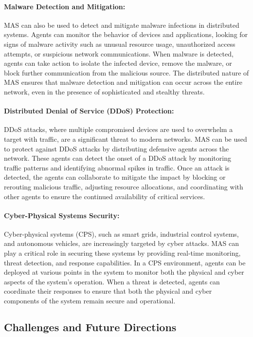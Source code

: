 \paragraph{Malware Detection and Mitigation:}
MAS can also be used to detect and mitigate malware infections in distributed systems. Agents can monitor the behavior of devices and applications, looking for signs of malware activity such as unusual resource usage, unauthorized access attempts, or suspicious network communications. When malware is detected, agents can take action to isolate the infected device, remove the malware, or block further communication from the malicious source. The distributed nature of MAS ensures that malware detection and mitigation can occur across the entire network, even in the presence of sophisticated and stealthy threats.

\paragraph{Distributed Denial of Service (DDoS) Protection:}
DDoS attacks, where multiple compromised devices are used to overwhelm a target with traffic, are a significant threat to modern networks. MAS can be used to protect against DDoS attacks by distributing defensive agents across the network. These agents can detect the onset of a DDoS attack by monitoring traffic patterns and identifying abnormal spikes in traffic. Once an attack is detected, the agents can collaborate to mitigate the impact by blocking or rerouting malicious traffic, adjusting resource allocations, and coordinating with other agents to ensure the continued availability of critical services.

\paragraph{Cyber-Physical Systems Security:}
Cyber-physical systems (CPS), such as smart grids, industrial control systems, and autonomous vehicles, are increasingly targeted by cyber attacks. MAS can play a critical role in securing these systems by providing real-time monitoring, threat detection, and response capabilities. In a CPS environment, agents can be deployed at various points in the system to monitor both the physical and cyber aspects of the system's operation. When a threat is detected, agents can coordinate their responses to ensure that both the physical and cyber components of the system remain secure and operational.

\subsection{Challenges and Future Directions}

